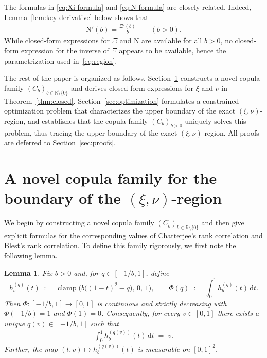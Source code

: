 \documentclass{article}
\newtheorem{lemma}[theorem]{Lemma}
\DeclareMathOperator{\clamp}{clamp}
\newcommand{\1}{\mathds{1}}
\newcommand{\de}{\mathrm{\,d}}
\newcommand{\R}{\mathbb{R}}
\newcommand{\NN}{\mathrm{N}}
\begin{document}
The formulas in \eqref{eq:Xi-formula} and \eqref{eq:N-formula} are closely related.
Indeed, Lemma~\ref{lem:key-derivative} below shows that
\begin{align}\label{eq:key-derivative}
\NN'(b)=\frac{\Xi'(b)}{b}
\qquad (b>0).
\end{align}
While closed-form expressions for $\Xi$ and $\NN$ are available for all $b>0$,
no closed-form expression for the inverse of $\Xi$ appears to be available,
hence the parametrization used in~\eqref{eq:region}.

The rest of the paper is organized as follows.
Section~\ref{sec:novel-copula} constructs a novel copula family $(C_b)_{b\in\R\setminus\{0\}}$ and derives closed-form expressions for $\xi$ and $\nu$ in Theorem~\ref{thm:closed}.
Section~\ref{sec:optimization} formulates a constrained optimization problem that characterizes the upper boundary of the exact \((\xi,\nu)\)-region, and establishes that the copula family $(C_b)_{b>0}$ uniquely solves this problem, thus tracing the upper boundary of the exact \((\xi,\nu)\)-region.
All proofs are deferred to Section~\ref{sec:proofs}.

\section{\texorpdfstring
  {A novel copula family for the boundary of the $(\xi,\nu)$-region}
  {A novel copula family for the boundary of the (xi,nu)-region}}
\label{sec:novel-copula}


We begin by constructing a novel copula family $(C_b)_{b\in\R\setminus\{0\}}$ and then give explicit formulas for the corresponding values of Chatterjee's rank correlation and Blest's rank correlation. To define this family rigorously, we first note the following lemma.

\begin{lemma}
    \label{lem:unique_q}
Fix $b>0$ and, for $q\in[-1/b,1]$, define
\[
h_b^{(q)}(t)\;:=\;\clamp\!\Big(b\big((1-t)^2-q\big),\,0,\,1\Big),\qquad
\Phi(q)\;:=\;\int_0^1 h_b^{(q)}(t)\de t.
\]
Then $\Phi:[-1/b,1]\to[0,1]$ is continuous and strictly decreasing with $\Phi(-1/b)=1$ and $\Phi(1)=0$.
Consequently, for every $v\in[0,1]$ there exists a unique $q(v)\in[-1/b,1]$ such that
\begin{align}\label{eq:marginal}
\int_0^1 h_b^{(q(v))}(t)\de t\;=\;v.
\end{align}
Further, the map $(t,v)\mapsto h_b^{(q(v))}(t)$ is measurable on $[0,1]^2$.
\end{lemma}
\end{document}

